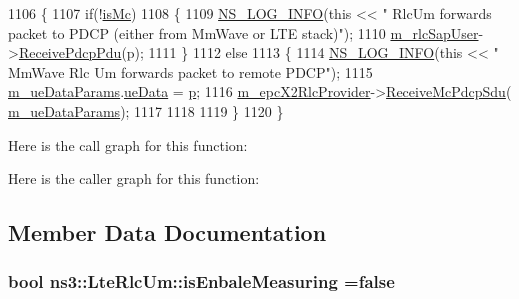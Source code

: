 \begin{DoxyCode}
1106 \{
1107   \textcolor{keywordflow}{if}(!\hyperlink{classns3_1_1LteRlc_a63b29f59aa944b3eaba8d8f156fba4c2}{isMc}) 
1108   \{
1109     \hyperlink{group__logging_gafbd73ee2cf9f26b319f49086d8e860fb}{NS\_LOG\_INFO}(\textcolor{keyword}{this} << \textcolor{stringliteral}{" RlcUm forwards packet to PDCP (either from MmWave or LTE stack)"});
1110     \hyperlink{classns3_1_1LteRlc_a0156774a917567c2cee1f353d56dfffa}{m\_rlcSapUser}->\hyperlink{classns3_1_1LteRlcSapUser_aaadbd52044f4bf26453b6eb2e26df9c8}{ReceivePdcpPdu}(p);
1111   \}
1112   \textcolor{keywordflow}{else}
1113   \{
1114     \hyperlink{group__logging_gafbd73ee2cf9f26b319f49086d8e860fb}{NS\_LOG\_INFO}(\textcolor{keyword}{this} << \textcolor{stringliteral}{" MmWave Rlc Um forwards packet to remote PDCP"});
1115     \hyperlink{classns3_1_1LteRlc_a6f4d5d0a7f8d3dd3c35a5fc0598ea3b8}{m\_ueDataParams}.\hyperlink{structns3_1_1EpcX2Sap_1_1UeDataParams_aa194f663de494c1bf03bd42e51b81a8e}{ueData} = \hyperlink{lte__link__budget_8m_ac9de518908a968428863f829398a4e62}{p};
1116     \hyperlink{classns3_1_1LteRlc_aa997bbf2807b79443887abd57facd1c8}{m\_epcX2RlcProvider}->\hyperlink{classns3_1_1EpcX2RlcProvider_ae58a8184e3a1b3243f328b8d0efe3352}{ReceiveMcPdcpSdu}(
      \hyperlink{classns3_1_1LteRlc_a6f4d5d0a7f8d3dd3c35a5fc0598ea3b8}{m\_ueDataParams});
1117 
1118 
1119   \}
1120 \}
\end{DoxyCode}


Here is the call graph for this function\+:




Here is the caller graph for this function\+:




\subsection{Member Data Documentation}
\subsubsection[{\texorpdfstring{is\+Enbale\+Measuring}{isEnbaleMeasuring}}]{\setlength{\rightskip}{0pt plus 5cm}bool ns3\+::\+Lte\+Rlc\+Um\+::is\+Enbale\+Measuring ={\bf false}\hspace{0.3cm}{\ttfamily [private]}}\hypertarget{classns3_1_1LteRlcUm_a33e4345196c0c97f6b1954e108ccbb45}{}\label{classns3_1_1LteRlcUm_a33e4345196c0c97f6b1954e108ccbb45}
